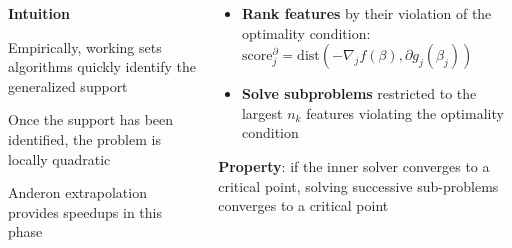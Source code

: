 \documentclass[english,final,t]{beamer}
\begin{document}
\begin{frame}{}
\begin{columns}[t]
\begin{column}{.3\linewidth}
	\begin{block}{\textbf{\color{malgared} Intuition}}

	Empirically, working sets algorithms quickly identify the generalized support

	Once the support has been identified, the problem is locally quadratic

	Anderon extrapolation provides speedups in this phase

	\end{block}
\end{column}
\begin{column}{.3\linewidth}
	\begin{block}{\textbf{\color{malgared}{\# 1 Features Priorization}}}
		\begin{itemize}
			\item
			\textbf{Rank features} by their violation of the optimality condition:
			  $\mathrm{score}^\partial_j = \mathrm{dist}(-\nabla_j f (\beta), \partial g_j (\beta_j))$
			\item \textbf{Solve subproblems} restricted to the largest $n_k$ features violating the optimality condition
		\end{itemize}
		\textbf{\color{malgared}Property}: if the inner solver converges to a critical point, solving successive sub-problems converges to a critical point
		\end{block}
	\begin{block}{\textbf{\color{malgared}{\# 2 Support Identification}}}

\end{block}
\end{column}
\end{columns}
\end{frame}
\end{document}
